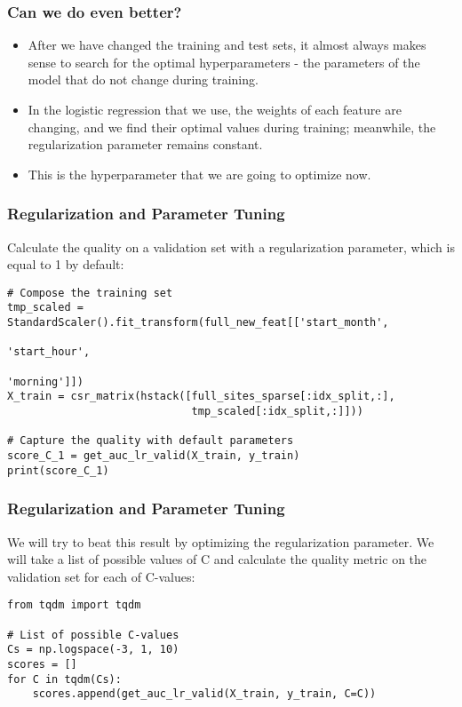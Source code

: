 \begin{frame}[fragile]\frametitle{Can we do even better? }

\begin{itemize}
\item After we have changed the training and test sets, it almost always makes sense to search for the optimal hyperparameters - the parameters of the model that do not change during training.
\item In the logistic regression that we use, the weights of each feature are changing, and we find their optimal values during training; meanwhile, the regularization parameter remains constant. 
\item This is the hyperparameter that we are going to optimize now.
\end{itemize}
\end{frame}

\begin{frame}[fragile]\frametitle{Regularization and Parameter Tuning}
Calculate the quality on a validation set with a regularization parameter, which is equal to 1 by default:

\begin{lstlisting}
# Compose the training set
tmp_scaled = StandardScaler().fit_transform(full_new_feat[['start_month', 
                                                           'start_hour', 
                                                           'morning']])
X_train = csr_matrix(hstack([full_sites_sparse[:idx_split,:], 
                             tmp_scaled[:idx_split,:]]))

# Capture the quality with default parameters
score_C_1 = get_auc_lr_valid(X_train, y_train)
print(score_C_1)
\end{lstlisting}
\end{frame}

\begin{frame}[fragile]\frametitle{Regularization and Parameter Tuning}
We will try to beat this result by optimizing the regularization parameter. We will take a list of possible values of C and calculate the quality metric on the validation set for each of C-values:

\begin{lstlisting}
from tqdm import tqdm

# List of possible C-values
Cs = np.logspace(-3, 1, 10)
scores = []
for C in tqdm(Cs):
    scores.append(get_auc_lr_valid(X_train, y_train, C=C))
\end{lstlisting}
\end{frame}


